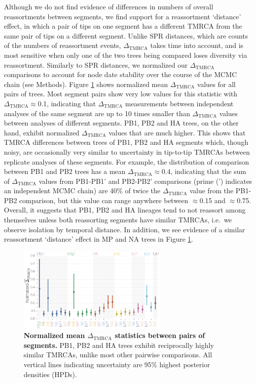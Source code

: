 \documentclass[11pt,oneside,letterpaper]{article}
\newcommand{\dtmrca}{\Delta_\mathrm{TMRCA}}
\begin{document}
Although we do not find evidence of differences in numbers of overall reassortments between segments, we find support for a reassortment `distance' effect, in which a pair of tips on one segment has a different TMRCA from the same pair of tips on a different segment.
Unlike SPR distances, which are counts of the numbers of reassortment events, $\dtmrca$ takes time into account, and is most sensitive when only one of the two trees being compared loses diversity via reassortment.
Similarly to SPR distances, we normalized our $\dtmrca$ comparisons to account for node date stability over the course of the MCMC chain (see Methods).
Figure \ref{deltaTMRCA} shows normalized mean $\dtmrca$ values for all pairs of trees.
Most segment pairs show very low values for this statistic with $\dtmrca\approx$0.1, indicating that $\dtmrca$ measurements between independent analyses of the same segment are up to 10 times smaller than $\dtmrca$ values between analyses of different segments.
PB1, PB2 and HA trees, on the other hand, exhibit normalized $\dtmrca$ values that are much higher.
This shows that TMRCA differences between trees of PB1, PB2 and HA segments which, though noisy, are occasionally very similar to uncertainty in tip-to-tip TMRCAs between replicate analyses of these segments.
For example, the distribution of comparison between PB1 and PB2 trees has a mean $\dtmrca$$\approx0.4$, indicating that the sum of $\dtmrca$ values from PB1-PB1' and PB2-PB2' comparisons (prime (') indicates an independent MCMC chain) are 40\% of twice the $\dtmrca$ value from the PB1-PB2 comparison, but this value can range anywhere between $\approx$0.15 and $\approx$0.75.
Overall, it suggests that PB1, PB2 and HA lineages tend to not reassort among themselves unless both reassorting segments have similar TMRCAs, i.e.\ we observe isolation by temporal distance.
In addition, we see evidence of a similar reassortment `distance' effect in MP and NA trees in Figure \ref{deltaTMRCA}.

\begin{figure}[h]
	\centering		
	\includegraphics[width=0.65\textwidth]{figures/InfB_normalizedMuDeltaTMRCA.png}
	\caption{\textbf{Normalized mean $\dtmrca$ statistics between pairs of segments.}
PB1, PB2 and HA trees exhibit reciprocally highly similar TMRCAs, unlike most other pairwise comparisons.
All vertical lines indicating uncertainty are 95\% highest posterior densities (HPDs).}
	\label{deltaTMRCA}
\end{figure}
\end{document}
